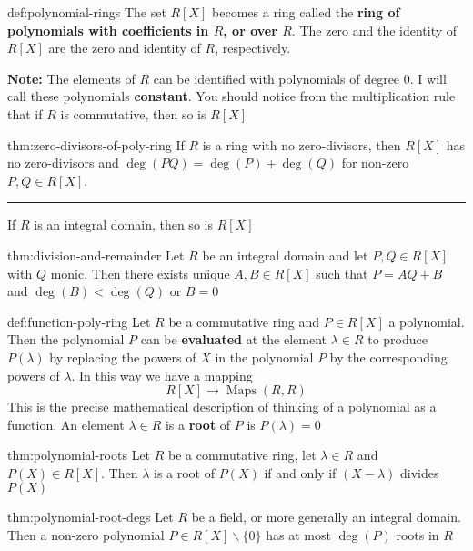 \documentclass{article}
\DeclareMathOperator{\Maps}{Maps}
\begin{document}
\begin{dfn}{def:polynomial-rings}{}
    The set $R[X]$ becomes a ring called the \textbf{ring of polynomials with coefficients in $R$, or over $R$}. The zero and the identity of $R[X]$ are the zero and identity of $R$, respectively.
\end{dfn}

\textbf{Note:} The elements of $R$ can be identified with polynomials of degree $0$. I will call these polynomials \textbf{constant}. You should notice from the multiplication rule that if $R$ is commutative, then so is $R[X]$

\begin{thm}{thm:zero-divisors-of-poly-ring}{}
    If $R$ is a ring with no zero-divisors, then $R[X]$ has no zero-divisors and $\deg(PQ) = \deg(P) + \deg(Q)$ for non-zero $P,Q\in R[X]$.
    
    \noindent\rule{\textwidth}{0.2pt}
    If $R$ is an integral domain, then so is $R[X]$
\end{thm}

\newpage
\begin{thm}{thm:division-and-remainder}{}
    Let $R$ be an integral domain and let $P, Q\in R[X]$ with $Q$ monic. Then there exists unique $A,B\in R[X]$ such that $P = AQ + B$ and $\deg(B) < \deg(Q)$ or $B = 0$
\end{thm}

\begin{dfn}{def:function-poly-ring}{}
    Let $R$ be a commutative ring and $P\in R[X]$ a polynomial. Then the polynomial $P$ can be \textbf{evaluated} at the element $\lambda\in R$ to produce $P(\lambda)$ by replacing the powers of $X$ in the polynomial $P$ by the corresponding powers of $\lambda$. In this way we have a mapping
    \[R[X] \to \Maps(R, R)\]
    This is the precise mathematical description of thinking of a polynomial as a function. An element $\lambda\in R$ is a \textbf{root} of $P$ is $P(\lambda) = 0$
\end{dfn}

\begin{thm}{thm:polynomial-roots}{}
    Let $R$ be a commutative ring, let $\lambda\in R$ and $P(X) \in R[X]$. Then $\lambda$ is a root of $P(X)$ if and only if $(X - \lambda)$ divides $P(X)$
\end{thm}

\begin{thm}{thm:polynomial-root-degs}{}
    Let $R$ be a field, or more generally an integral domain. Then a non-zero polynomial $P\in R[X] \backslash \{0\}$ has at most $\deg(P)$ roots in $R$
\end{thm}
\end{document}
